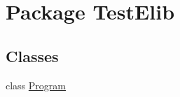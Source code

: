\hypertarget{namespace_test_elib}{
\section{Package TestElib}
\label{namespace_test_elib}
}
\subsection*{Classes}
\begin{DoxyCompactItemize}
\item 
class \hyperlink{class_test_elib_1_1_program}{Program}
\end{DoxyCompactItemize}
